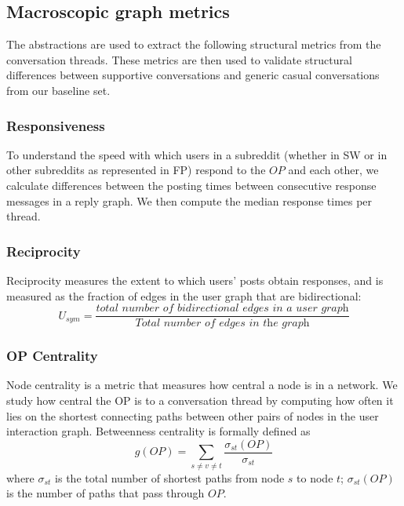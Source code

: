 


\subsection{Macroscopic graph metrics}
The abstractions are used to extract the following structural metrics from the conversation threads. These metrics are then used to validate structural differences between supportive conversations and generic casual conversations from our baseline set.%



\subsubsection{Responsiveness}
To understand the speed with which users in a subreddit (whether in SW or in other subreddits as represented in FP) respond to the $OP$ and each other,  we calculate differences between the posting times between consecutive response messages in a reply graph. We then compute the median response times per thread.


\subsubsection{Reciprocity}
Reciprocity measures the extent to which users' posts obtain responses, and is measured as the fraction of edges in the user graph that are bidirectional:
$$
U_{sym}=\frac{\textit{total number of bidirectional edges in a user graph}}{\textit{Total number of edges in the graph}}
$$

\subsubsection{OP Centrality} \label{sec:centrality}
Node centrality is a metric that measures how central a node is in a network. We study how central the OP is to a conversation thread by computing how often it lies on the shortest connecting paths between other pairs of nodes in the user interaction graph. Betweenness centrality is formally defined as 
$$
g(OP) = \sum_{s \neq v \neq t}\frac{\sigma_{st}(OP)}{\sigma_{st}}
$$
where $\sigma_{st}$ is the total number of shortest paths from node $s$ to node $t$; 
$\sigma_{st}(OP)$ is the number of 
paths that pass through $OP$. %



